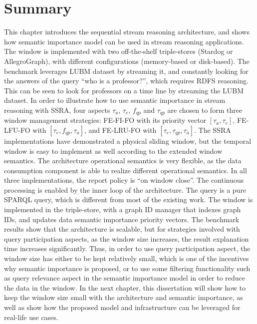 \section{Summary}
This chapter introduces the sequential stream reasoning architecture, and shows how semantic importance model can be used in stream reasoning applications. 
The window is implemented with two off-the-shelf triple-stores (Stardog or AllegroGraph), with different configurations (memory-based or disk-based).
The benchmark leverages LUBM dataset by streaming it, and constantly looking for the answers of the query ``who is a professor?'', which requires RDFS reasoning.
This can be seen to look for professors on a time line by streaming the LUBM dataset. 
In order to illustrate how to use semantic importance in stream reasoning with SSRA, four aspects $\tau_{a}$, $\tau_{e}$, $f_{qp}$ and $\tau_{qp}$ are chosen to form three window management strategies:
FE-FI-FO with its priority vector $[\tau_{a}, \tau_{e}]$, FE-LFU-FO with $[\tau_{e}, f_{qp}, \tau_{a}]$, and FE-LRU-FO with $[\tau_{e}, \tau_{qp}, \tau_{a}]$. 
The SSRA implementations have demonstrated a physical sliding window, but the temporal window is easy to implement as well according to the extended window semantics.
The architecture operational semantics is very flexible, as the data consumption component is able to realize different operational semantics. 
In all three implementations, the report policy is ``on window close''.
The continuous processing is enabled by the inner loop of the architecture. 
The query is a pure SPARQL query, which is different from most of the existing work. 
The window is implemented in the triple-store, with a graph ID manager that indexes graph IDs, and updates data semantic importance priority vectors.
The benchmark results show that the architecture is scalable, but for strategies involved with query participation aspects, as the window size increases, the result explanation time increases significantly.
Thus, in order to use query participation aspect, the window size has either to be kept relatively small, which is one of the incentives why semantic importance is proposed, 
or to use some filtering functionality such as query relevance aspect in the semantic importance model in order to reduce the data in the window. 
In the next chapter, this dissertation will show how to keep the window size small with the architecture and semantic importance, as well as show how the proposed model and infrastructure can be leveraged for real-life use cases.